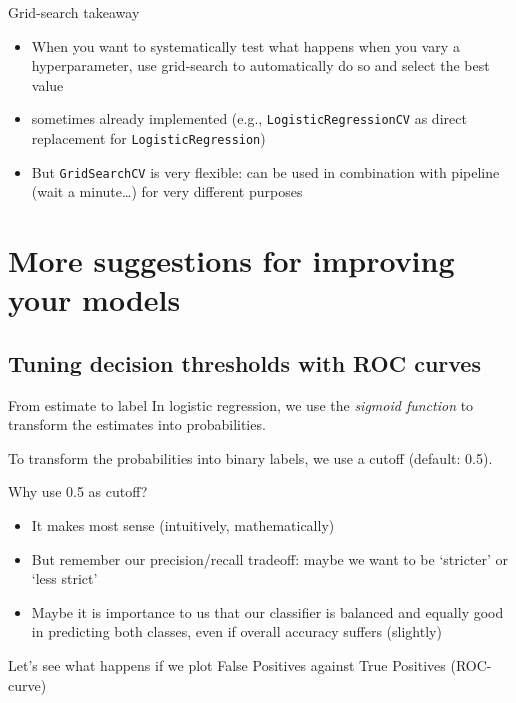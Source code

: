 \begin{frame}{Grid-search takeaway}
\begin{itemize}[<+->]
\item When you want to systematically test what happens when you vary a hyperparameter, use grid-search to automatically do so and select the best value
\item sometimes already implemented (e.g., \texttt{LogisticRegressionCV} as direct replacement for \texttt{LogisticRegression})
\item But \texttt{GridSearchCV} is very flexible: can be used in combination with pipeline (wait a minute\ldots) for very different purposes
\end{itemize}


\end{frame}











\section[More suggestions ]{More suggestions for improving your models}



\subsection{Tuning decision thresholds with ROC curves}

\begin{frame}{From estimate to label}
In logistic regression, we use the \textit{sigmoid function} to transform the estimates into probabilities.

To transform the probabilities into binary labels, we use a cutoff (default: 0.5).
\end{frame}

\begin{frame}{Why use 0.5 as cutoff?}
\begin{itemize}[<+->]
	\item It makes most sense (intuitively, mathematically)
	\item But remember our precision/recall tradeoff: maybe we want to be `stricter' or `less strict'
	\item Maybe it is importance to us that our classifier is balanced and equally good in predicting both classes, even if overall accuracy suffers (slightly) 
\end{itemize}
\pause
Let's see what happens if we plot False Positives against True Positives (ROC-curve)
\end{frame}


